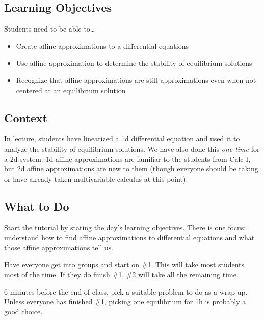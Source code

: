 \subsection*{Learning Objectives}
Students need to be able to\ldots
\begin{itemize}
	\item Create affine approximations to a differential equations
	\item Use affine approximation to determine the stability of equilibrium solutions
	\item Recognize that affine approximations are still approximations even when not centered at an equilibrium solution
\end{itemize}

\subsection*{Context}
In lecture, students have linearized a 1d differential equation and used it to analyze the stability of equilibrium solutions.
We have also done this \emph{one time} for a 2d system. 1d affine approximations are familiar to the students from Calc I,
but 2d affine approximations are new to them (though everyone should be taking or have already taken multivariable calculus at this point).

\subsection*{What to Do}
Start the tutorial by stating the day's learning objectives. There is one focus: understand
how to find affine approximations to differential equations and what those affine approximations tell us.

Have everyone get into groups and start on \#1. This will take most students most of the time. If they
do finish \#1, \#2 will take all the remaining time.

6 minutes before the end of class, pick a suitable problem to do as a wrap-up. Unless everyone has finished \#1,
picking one equilibrium for 1h is probably a good choice.

